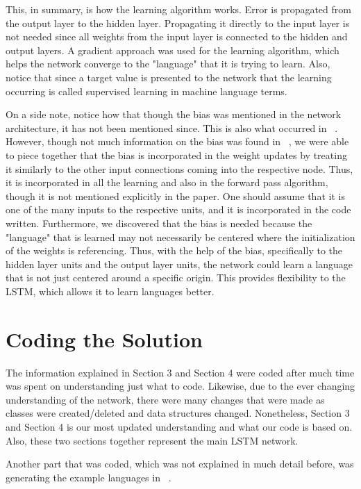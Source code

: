 \documentclass[11pt,letterpaper]{article}
\begin{document}
	This, in summary, is how the learning algorithm works. Error is propagated from the output layer to the hidden layer. Propagating it directly to the input layer is not needed since all weights from the input layer is connected to the hidden and output layers. A gradient approach was used for the learning algorithm, which helps the network converge to the "language" that it is trying to learn. Also, notice that since a target value is presented to the network that the learning occurring is called supervised learning in machine language terms.

	On a side note, notice how that though the bias was mentioned in the network architecture, it has not been mentioned since. This is also what occurred in ~\cite{Gers:01}. However, though not much information on the bias was found in ~\cite{Gers:01}, we were able to piece together that the bias is incorporated in the weight updates by treating it similarly to the other input connections coming into the respective node. Thus, it is incorporated in all the learning and also in the forward pass algorithm, though it is not mentioned explicitly in the paper. One should assume that it is one of the many inputs to the respective units, and it is incorporated in the code written. Furthermore, we discovered that the bias is needed because the "language" that is learned may not necessarily be centered where the initialization of the weights is referencing. Thus, with the help of the bias, specifically to the hidden layer units and the output layer units, the network could learn a language that is not just centered around a specific origin. This provides flexibility to the LSTM, which allows it to learn languages better.

	\section{Coding the Solution}
	The information explained in Section 3 and Section 4 were coded after much time was spent on understanding just what to code. Likewise, due to the ever changing understanding of the network, there were many changes that were made as classes were created/deleted and data structures changed. Nonetheless, Section 3 and Section 4 is our most updated understanding and what our code is based on. Also, these two sections together represent the main LSTM network.

	Another part that was coded, which was not explained in much detail before, was generating the example languages in ~\cite{Gers:01}.
\end{document}
